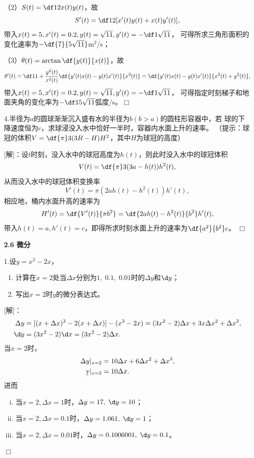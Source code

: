 （2）$S(t)=\df12x(t)y(t)$，故
$$S'(t)=\df12[x'(t)y(t)+x(t)y'(t)],$$
带入$x(t)=5,x'(t)=0.2,y(t)=\sqrt{11},y'(t)=-\df1{\sqrt{11}}$，
可得所求三角形面积的变化速率为$-\df{7}{5\sqrt{11}}$m$^2$/s；

（3）$\theta(t)=\arctan\df{y(t)}{x(t)}$，故
$$\theta'(t)=\df1{1+\frac{y^2(t)}{x^2(t)}}
\df{y'(t)x(t)-y(t)x'(t)}{x^2(t)}=\df{y'(t)x(t)-y(t)x'(t)}{x^2(t)+y^2(t)},$$
带入$x(t)=5,x'(t)=0.2,y(t)=\sqrt{11},y'(t)=-\df1{\sqrt{11}}$，
可得指定时刻梯子和地面夹角的变化率为$-\df1{5\sqrt{11}}$弧度/s。\hfill$\Box$

\bigskip

4.半径为$a$的圆球渐渐沉入盛有水的半径为$b(b>a)$的圆柱形容器中，若
球的下降速度恒为$c$，求球浸没入水中恰好一半时，容器内水面上升的速率。
（提示：球冠的体积$V=\df{\pi}3(3R-H)H^2$，其中$H$为球冠的高度）

[解]：设$t$时刻，没入水中的球冠高度为$h(t)$，则此时没入水中的球冠体积
$$V(t)=\df{\pi}3(3a-h(t))h^2(t),$$
从而没入水中的球冠体积变换率
$$V'(t)=\pi(2ah(t)-h^2(t))h'(t),$$
相应地，桶内水面升高的速率为
$$H'(t)=\df{V'(t)}{\pi b^2}=\df{2ah(t)-h^2(t)}{b^2}h'(t),$$
带入$h(t)=a,h'(t)=c$，即得所求时刻水面上升的速率为$\df{a^2}{b^2}c$。
\hfill$\Box$

\begin{center}
	\bf 2.6 微分
\end{center}

\bigskip

1.设$y=x^3-2x$，
\begin{enumerate}[(1)]
  \setlength{\itemindent}{1cm}
  \item 计算在$x=2$处当$\Delta x$分别为$1,\;0.1,\;
  0.01$时的$\Delta y$和$\d y$；
  \item 写出$x=2$时$y$的微分表达式。
\end{enumerate}

[解]：
\begin{align*}
	\Delta y&=[(x+\Delta x)^3-2(x+\Delta x)]-(x^3-2x)
	=(3x^2-2)\Delta x+3x\Delta x^2+\Delta x^3,\\
	\d y&=(3x^2-2)\d x=(3x^2-2)\Delta x.
\end{align*}
当$x=2$时，
\begin{align*}
	\Delta y|_{x=2}&
	=10\Delta x+6\Delta x^2+\Delta x^3,\\
	\d y|_{x=2}&=10\Delta x.
\end{align*}
进而
\begin{enumerate}[(i)]
  \item 当$x=2,\Delta x=1$时，$\Delta y=17,\;\d y=10$；
  \item 当$x=2,\Delta x=0.1$时，$\Delta y=1.061,\;\d y=1$；
  \item 当$x=2,\Delta x=0.01$时，$\Delta y=0.1006001,\;\d y=0.1$。
\end{enumerate}
\hfill$\Box$

